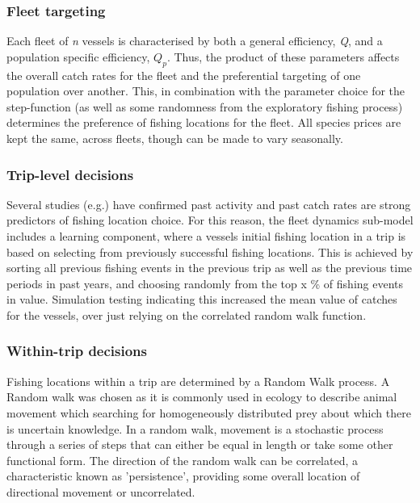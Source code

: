 \documentclass[review]{elsarticle}
\begin{document}
\subsubsection{Fleet targeting}

Each fleet of \textit{n} vessels is characterised by both a general efficiency,
\textit{Q}, and a population specific efficiency, ${Q_{p}}$.  Thus, the product
of these parameters affects the overall catch rates for the fleet and the
preferential targeting of one population over another. This, in combination
with the parameter choice for the step-function (as well as some randomness
from the exploratory fishing process) determines the preference of fishing
locations for the fleet.  All species prices are kept the same, across fleets,
though can be made to vary seasonally.  

\subsubsection{Trip-level decisions}

Several studies (e.g.\cite{Hutton2004, Tidd2012, Girardin2015}) have confirmed
past activity and past catch rates are strong predictors of fishing location
choice. For this reason, the fleet dynamics sub-model includes a learning
component, where a vessels initial fishing location in a trip is based on
selecting from previously successful fishing locations. This is achieved by
sorting all previous fishing events in the previous trip as well as the
previous time periods in past years, and choosing randomly from the top x \% of
fishing events in value.  Simulation testing indicating this increased the mean
value of catches for the vessels, over just relying on the correlated random
walk function. 

\subsubsection{Within-trip decisions}

Fishing locations within a trip are determined by a Random Walk process. A
Random walk was chosen as it is commonly used in ecology to describe animal
movement which searching for homogeneously distributed prey about which there
is uncertain knowledge. In a random walk, movement is a stochastic process
through a series of steps that can either be equal in length or take some other
functional form.  The direction of the random walk can be correlated, a
characteristic known as 'persistence', providing some overall location
of directional movement \cite{Codling2008} or uncorrelated. \\
\end{document}
